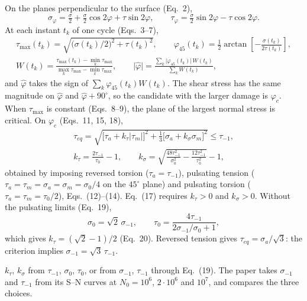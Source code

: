  On the planes perpendicular to the surface (Eq.~2),
\begin{equation}
\sigma_\varphi = \tfrac{\sigma}{2}+\tfrac{\sigma}{2}\cos2\varphi+\tau\sin2\varphi ,\qquad
\tau_\varphi = \tfrac{\sigma}{2}\sin2\varphi-\tau\cos2\varphi .
\label{eq:w18-plane}
\end{equation}
At each instant $t_k$ of one cycle (Eqs.~3--7),
\begin{gather}
\tau_{\max}(t_k)=\sqrt{\bigl(\sigma(t_k)/2\bigr)^2+\tau(t_k)^2},\qquad
\varphi_{45}(t_k)=\tfrac12\arctan\!\left[-\frac{\sigma(t_k)}{2\tau(t_k)}\right],\\
W(t_k)=\frac{\tau_{\max}(t_k)-\min_k\tau_{\max}}{\max_k\tau_{\max}-\min_k\tau_{\max}},\qquad
\lvert\hat\varphi\rvert=\frac{\sum_k\lvert\varphi_{45}(t_k)\rvert\,W(t_k)}{\sum_k W(t_k)} ,
\label{eq:w18-weight}
\end{gather}
and $\hat\varphi$ takes the sign of $\sum_k\varphi_{45}(t_k)W(t_k)$. The shear stress has the same
magnitude on $\hat\varphi$ and $\hat\varphi+90^\circ$, so the candidate with the larger damage is
$\varphi_c$. When $\tau_{\max}$ is constant (Eqs.~8--9), the plane of the largest normal stress is
critical. On $\varphi_c$ (Eqs.~11, 15, 18),
\begin{gather}
\tau_{eq}=\sqrt{\bigl[\tau_a+k_\tau\lvert\tau_m\rvert\bigr]^2+\tfrac13\bigl[\sigma_a+k_\sigma\sigma_m\bigr]^2}\le\tau_{-1},
\label{eq:w18}\\
k_\tau=\frac{2\tau_{-1}}{\tau_0}-1,\qquad
k_\sigma=\sqrt{\frac{48\tau_{-1}^2}{\sigma_0^2}-\frac{12\tau_{-1}^2}{\tau_0^2}}-1 ,
\label{eq:w18-k}
\end{gather}
obtained by imposing reversed torsion ($\tau_a=\tau_{-1}$), pulsating tension
($\tau_a=\tau_m=\sigma_a=\sigma_m=\sigma_0/4$ on the $45^\circ$ plane) and pulsating torsion
($\tau_a=\tau_m=\tau_0/2$), Eqs.~(12)--(14). Eq.~(17) requires $k_\tau>0$ and $k_\sigma>0$.
Without the pulsating limits (Eq.~19),
\begin{equation}
\sigma_0=\sqrt2\,\sigma_{-1},\qquad \tau_0=\frac{4\tau_{-1}}{2\sigma_{-1}/\sigma_0+1},
\end{equation}
which gives $k_\tau=(\sqrt2-1)/2$ (Eq.~20). Reversed tension gives $\tau_{eq}=\sigma_a/\sqrt3$: the
criterion implies $\sigma_{-1}=\sqrt3\,\tau_{-1}$.

 $k_\tau$, $k_\sigma$ from $\tau_{-1}$, $\sigma_0$, $\tau_0$, or
from $\sigma_{-1}$, $\tau_{-1}$ through Eq.~(19). The paper takes $\sigma_{-1}$ and $\tau_{-1}$
from its S--N curves at $N_0=10^6$, $2\cdot10^6$ and $10^7$, and compares the three choices.

